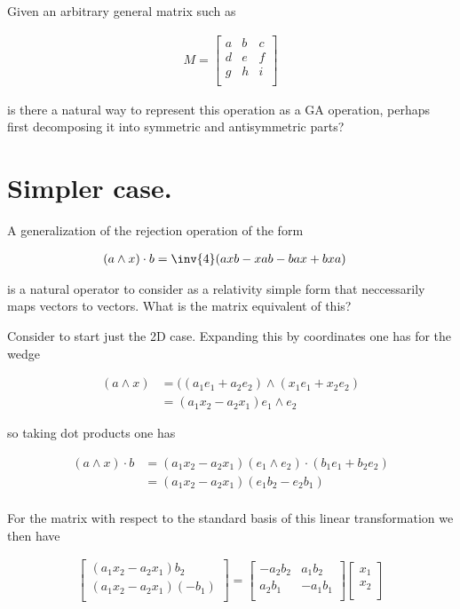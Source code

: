 \documentclass{article}
\begin{document}
Given an arbitrary general matrix such as 

\begin{align*}
M = 
\begin{bmatrix}
a & b & c \\
d & e & f \\
g & h & i \\
\end{bmatrix}
\end{align*}

is there a natural way to represent this operation as a GA operation, perhaps first decomposing it into symmetric and antisymmetric parts?

\section{ Simpler case. }

A generalization of the rejection operation of the form

\begin{align*}
(a \wedge x ) \cdot b 
&= \inv{4} ( a x b - x a b - b a x + b x a )
\end{align*}

is a natural operator to consider as a relativity simple form that neccessarily maps vectors to vectors.  What is the matrix equivalent of this?

Consider to start just the 2D case.  Expanding this by coordinates one has for the wedge

\begin{align*}
(a \wedge x)
&= ((a_1 e_1 + a_2 e_2) \wedge (x_1 e_1 + x_2 e_2) \\
&= (a_1 x_2 - a_2 x_1) e_1 \wedge e_2
\end{align*}

so taking dot products one has

\begin{align*}
(a \wedge x ) \cdot b
&= (a_1 x_2 - a_2 x_1) (e_1 \wedge e_2) \cdot (b_1 e_1 + b_2 e_2) \\
&= (a_1 x_2 - a_2 x_1) (e_1 b_2 - e_2 b_1) \\
\end{align*}

For the matrix with respect to the standard basis of this linear transformation we then have

\begin{align*}
\begin{bmatrix}
(a_1 x_2 - a_2 x_1) b_2 \\
(a_1 x_2 - a_2 x_1) (-b_1) \\
\end{bmatrix}
=
\begin{bmatrix}
- a_2 b_2 & a_1 b_2  \\
a_2 b_1 & -a_1 b_1 \\
\end{bmatrix}
\begin{bmatrix}
x_1 \\
x_2 \\
\end{bmatrix}
\end{align*}
\end{document}
